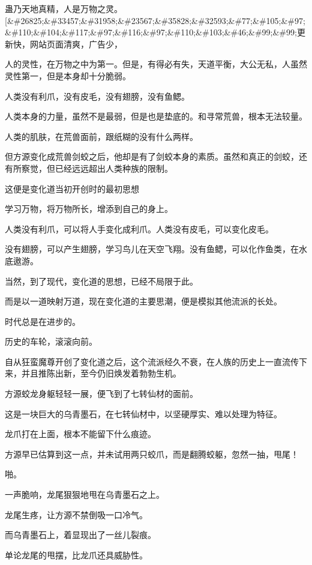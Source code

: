 
\begin{this_body}

蛊乃天地真精，人是万物之灵。[\&\#26825;\&\#33457;\&\#31958;\&\#23567;\&\#35828;\&\#32593;\&\#77;\&\#105;\&\#97;\&\#110;\&\#104;\&\#117;\&\#97;\&\#116;\&\#97;\&\#110;\&\#103;\&\#46;\&\#99;\&\#99;更新快，网站页面清爽，广告少，

人的灵性，在万物之中为第一。但是，有得必有失，天道平衡，大公无私，人虽然灵性第一，但是本身却十分脆弱。

人类没有利爪，没有皮毛，没有翅膀，没有鱼鳃。

人类本身的力量，虽然不是最弱，但是也是垫底的。和寻常荒兽，根本无法较量。

人类的肌肤，在荒兽面前，跟纸糊的没有什么两样。

但方源变化成荒兽剑蛟之后，他却是有了剑蛟本身的素质。虽然和真正的剑蛟，还有所察觉，但已经远远超出人类种族的限制。

这便是变化道当初开创时的最初思想

学习万物，将万物所长，增添到自己的身上。

人类没有利爪，可以将人手变化成利爪。人类没有皮毛，可以变化皮毛。

没有翅膀，可以产生翅膀，学习鸟儿在天空飞翔。没有鱼鳃，可以化作鱼类，在水底遨游。

当然，到了现代，变化道的思想，已经不局限于此。

而是以一道映射万道，现在变化道的主要思潮，便是模拟其他流派的长处。

时代总是在进步的。

历史的车轮，滚滚向前。

自从狂蛮魔尊开创了变化道之后，这个流派经久不衰，在人族的历史上一直流传下来，并且推陈出新，至今仍旧焕发着勃勃生机。

方源蛟龙身躯轻轻一展，便飞到了七转仙材的面前。

这是一块巨大的乌青墨石，在七转仙材中，以坚硬厚实、难以处理为特征。

龙爪打在上面，根本不能留下什么痕迹。

方源早已估算到这一点，并未试用两只蛟爪，而是翻腾蛟躯，忽然一抽，甩尾！

啪。

一声脆响，龙尾狠狠地甩在乌青墨石之上。

龙尾生疼，让方源不禁倒吸一口冷气。

而乌青墨石上，着显现出了一丝儿裂痕。

单论龙尾的甩摆，比龙爪还具威胁性。


\end{this_body}
